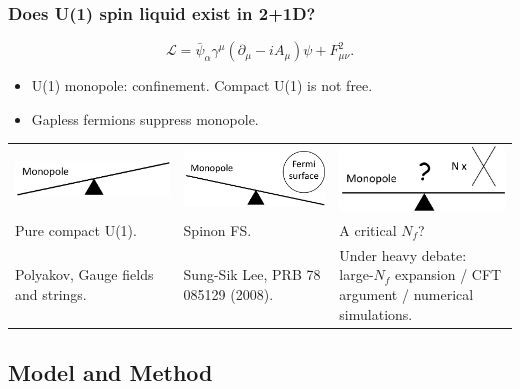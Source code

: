 \documentclass[xcolor=table, 10pt, aspectratio=43]{beamer}
\begin{document}
\begin{frame}
	\frametitle{Does U(1) spin liquid exist in 2+1D?}
	\[\mathcal L = \bar\psi_\alpha \gamma^\mu(\partial_\mu-iA_\mu)\psi + F_{\mu\nu}^2.\]
	\begin{itemize}
		\item U(1) monopole: confinement. Compact U(1) is \alert{not free}.
		\item Gapless fermions suppress monopole.
	\end{itemize}
	\begin{tabular}{p{}p{}p{}}
		\includegraphics[scale=.35]{../u1sl/balance1}
		&
		\includegraphics[scale=.35]{../u1sl/balance2}
		&
		\includegraphics[scale=.35]{../u1sl/balance3}\\
		Pure compact U(1). & Spinon FS. & A critical $N_f$?\\
		Polyakov, Gauge fields and strings. & Sung-Sik Lee, PRB 78 085129 (2008). & Under heavy debate: large-$N_f$ expansion / CFT argument / numerical simulations.
	\end{tabular}
\end{frame}

\subsection{Model and Method}
\end{document}
